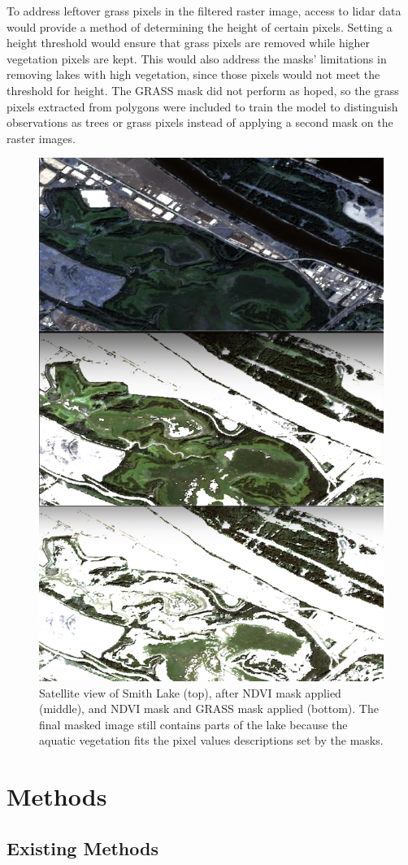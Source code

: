 \documentclass[12pt,twoside]{reedthesis}
\begin{document}
To address leftover grass pixels in the filtered raster image, access to lidar data would provide a method of determining the height of certain pixels. Setting a height threshold would ensure that grass pixels are removed while higher vegetation pixels are kept. This would also address the masks' limitations in removing lakes with high vegetation, since those pixels would not meet the threshold for height. The GRASS mask did not perform as hoped, so the grass pixels extracted from polygons were included to train the model to distinguish observations as trees or grass pixels instead of applying a second mask on the raster images.
\begin{figure}

{\centering \includegraphics[width=0.4\linewidth]{figure/masklimit} 

}

\caption{Satellite view of Smith Lake (top), after NDVI mask applied (middle), and NDVI mask and GRASS mask applied (bottom). The final masked image still contains parts of the lake because the aquatic vegetation fits the pixel values descriptions set by the masks.}\label{fig:masklimit}
\end{figure}
\hypertarget{methods}{%
\chapter{Methods}\label{methods}}

\hypertarget{existing-methods}{%
\section{Existing Methods}\label{existing-methods}}
\end{document}
